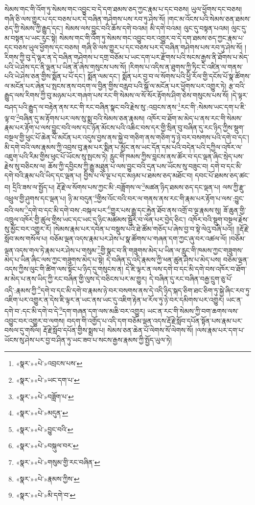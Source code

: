སེམས་གང་གི་འོག་ཏུ་སེམས་གང་འབྱུང་བ་དེ་དག་ཐམས་ཅད་ཀྱང་རྣམ་པ་དང་བཅས། ཡུལ་ཕྱོགས་དང་བཅས། གཞི་ཅི་ལས་གྱུར་པ་དང་བཅས་པར་དེ་བཞིན་གཤེགས་པས་རབ་ཏུ་ཤེས་སོ། །གང་མ་འོངས་པའི་སེམས་ཅན་ཐམས་ཅད་ཀྱི་སེམས་ཀྱི་རྒྱུད་དང་། སེམས་ལས་བྱུང་བའི་ཆོས་དགེ་བའམ། མི་དགེ་བའམ། ལུང་དུ་བསྟན་པའམ། ལུང་དུ་མ་བསྟན་པ་ཡང་རུང་སྟེ། སེམས་གང་གི་འོག་ཏུ་སེམས་གང་འབྱུང་བར་འགྱུར་བ་དེ་དག་ཐམས་ཅད་ཀྱང་རྣམ་པ་དང་བཅས་ཡུལ་ཕྱོགས་དང་བཅས། གཞི་ཅི་ལས་གྱུར་པ་དང་བཅས་པར་དེ་བཞིན་གཤེགས་པས་རབ་ཏུ་ཤེས་སོ། །རིགས་ཀྱི་བུ་དེ་ལྟར་ན་དེ་བཞིན་གཤེགས་པ་དགྲ་བཅོམ་པ་ཡང་དག་པར་རྫོགས་པའི་སངས་རྒྱས་ནི་ཐོགས་པ་མེད་པའི་ཡེ་ཤེས་དང་ནི་ལྡན་པ་ཡིན་ནོ་ཞེས་གསུངས་པས་སོ། །རིགས་པ་འདིས་ན་ཐུགས་ཀྱི་ཏིང་ངེ་འཛིན་ལ་གནས་པའི་ཡེ་ཤེས་ཅན་གྱིས་སྨོན་པ་པོ་དང་། སྨོན་ལམ་དང་། སྨོན་པར་བྱ་བ་ལ་སོགས་པའི་ཕྱི་རོལ་གྱི་དངོས་པོ་སྣ་ཚོགས་ལ་མངོན་པར་ཞེན་པ་སྤངས་ནས་བདག་ལ་བྱིན་གྱིས་བརླབ་པའི་སྒོ་ལ་མངོན་པར་ཕྱོགས་པར་འགྱུར་ཏེ། རྩ་བའི་རྒྱུད་ལས་རིགས་ཀྱི་བུ་མཉམ་པར་གཞག་པས་རང་གི་སེམས་ལ་སོ་སོར་རྟོགས་ཤིག་ཅེས་གསུངས་པས་སོ། །དེ་ལྟར་བཤད་པའི་རྒྱུད་ལ་བརྟེན་ནས་རང་གི་རང་བཞིན་སྣང་བའི་རྗེས་སུ་:འབྲངས་ནས་\footnote{«སྣར་»«པེ་»འབྲངས་པས་}རང་གི་:སེམས་ཡང་དག་པ་ཇི་ལྟ་བ་\footnote{«སྣར་»«པེ་»ཡང་དག་པ་}བཞིན་དུ་མ་རྟོགས་པར་ལས་སུ་སྨྲ་བའི་སེམས་ཅན་རྣམས། འཁོར་བ་ཐོག་མ་མེད་པ་ནས་རང་གི་སེམས་རྣམ་པར་རྟོག་པ་ལས་བྱུང་བའི་ལས་དང་ཉོན་མོངས་པའི་འཆིང་བས་དར་གྱི་སྲིན་བུ་བཞིན་དུ་རང་ཉིད་ཀྱིས་སྡུག་བསྔལ་གྱི་ཕུང་པོ་ཆེན་པོ་མངོན་པར་འདུས་བྱས་ནས་སྐྱེ་བ་གཅིག་ནས་གཅིག་ཏུ་ཉེ་བར་བསགས་པའི་དགེ་བ་དང་། མི་དགེ་བའི་ལས་རྣམས་ཀྱི་འབྲས་བུ་རྣམ་པར་སྨིན་པ་མྱོང་ནས་ཡང་དོན་དམ་པའི་བདེན་པའི་དཀྱིལ་འཁོར་ལ་འཇུག་པའི་རིམ་གྱིས་ཕུང་པོ་ཡོངས་སུ་སྤངས་ཏེ། རླུང་གི་ཁམས་ཀྱིས་བླངས་ནས་ཚོར་བ་དང་ལྡན་ཞིང་སྲེད་པས་རྗེས་སུ་བཅིངས་ལ། ཆོས་ཀྱི་དབྱིངས་ཀྱི་རྒྱུ་མཐུན་པ་ལས་བྱུང་བའི་དྲན་པས་ཡོངས་སུ་བཟུང་བ། དགེ་བ་དང་མི་དགེ་བའི་རྣམ་པའི་ཡིད་དང་ལྡན་པ། བྱིས་པ་ལོ་ལྔ་པ་དང་མཉམ་པ་ཐམས་ཅད་མཐོང་བ། དབང་པོ་ཐམས་ཅད་ཚང་བ། དྲིའི་ཟས་ལ་སྤྱོད་པ། རྡོ་རྗེ་ལ་སོགས་པས་ཀྱང་མི་:བཟློགས་ལ་\footnote{«སྣར་»«པེ་»བཟློག་པ་}མཚན་ཉིད་ཐམས་ཅད་དང་ལྡན་པ། ལས་ཀྱི་རྫུ་འཕྲུལ་གྱི་ཤུགས་དང་ལྡན་པ། ཉི་མ་བདུན་\footnote{«སྣར་»«པེ་»མདུན་}གྱིས་འོང་བའི་བར་ལ་གནས་ནས་རང་གི་རྣམ་པར་རྟོག་པ་ལས་:བྱུང་བའི་ལས་\footnote{«སྣར་»«པེ་»བྱུང་བའི་}དགེ་བ་དང་མི་དགེ་བས་:བསྐལ་པར་\footnote{«སྣར་»«པེ་»བསྐུལ་བར་}གྱུར་པས་རྒྱུ་དང་རྐྱེན་ཐོབ་ནས་འགྲོ་བ་ལྔ་རྣམས་སུ། ཟོ་ཆུན་གྱི་འཁྲུལ་འཁོར་གྱི་ཚུལ་གྱིས་ཡང་དང་ཡང་དུ་ཉིང་མཚམས་སྦྱོར་བ་ལེན་པར་བྱེད་ཅིང་། འཁོར་བའི་སྡུག་བསྔལ་རྗེས་སུ་མྱོང་བར་འགྱུར་རོ། །སེམས་རྣམ་པར་དབེན་པ་བསྡུས་པའི་ཐེ་ཚོམ་གཅོད་པ་ཞེས་བྱ་བ་སྟེ་ལེའུ་བཞི་པའོ།། །།རྡོ་རྗེ་སློབ་མས་གསོལ་པ། བཅོམ་ལྡན་འདས་རྣམ་པར་ཤེས་པ་སྣ་ཚོགས་པ་གཞན་དག་ཀྱང་ཞུ་བར་འཚལ་ལོ། །བཅོམ་ལྡན་འདས་གལ་ཏེ་རྣམ་པར་ཤེས་པ་གསུམ་\footnote{«སྣར་»«པེ་»གསུམ་གྱི་རང་བཞིན་}གྱི་སྣང་བ་ནི་གཟུགས་མེད་པ་ཡིན་ལ་རླུང་གི་ཁམས་ཀྱང་གཟུགས་མེད་པ་ཡིན་ཞིང་ལས་ཀྱང་གཟུགས་མེད་པ་སྟེ། དེ་བཞིན་དུ་འདི་རྣམས་ཀྱི་ཕན་ཚུན་ཤེས་པ་མེད་པས། བཅོམ་ལྡན་འདས་ཀྱིས་ལུང་གི་ཚིག་ལས་སྟོང་པ་ཉིད་དུ་གསུངས་ན། དེ་ཇི་ལྟར་ན་ལས་དགེ་བ་དང་མི་དགེ་བས་འཁོར་བ་ཐོག་མ་མེད་པ་ནས་ཡིད་ཀྱི་རང་བཞིན་གྱི་ལུས་དེ་བཅིངས་པར་མ་གྱུར། དེ་བཞིན་དུ་རང་བཞིན་བརྒྱ་དྲུག་ཅུ་པོ་འདི་:རྣམས་ཀྱི་\footnote{«སྣར་»«པེ་»རྣམས་ཀྱིས་}དགེ་བ་དང་མི་དགེ་བ་རྣམས་ཉེ་བར་བསགས་ནས་དེ་འདི་ཉིད་སྐད་ཅིག་ཐང་ཅིག་ཏུ་སྐྱེ་ཞིང་རབ་ཏུ་འཇིག་པར་འགྱུར་ན་དེས་ཇི་ལྟར་ན་ཡང་ནས་ཡང་དུ་འཇིག་རྟེན་ཕ་རོལ་ཏུ་ཉེ་བར་དམིགས་པར་འགྱུར། ཡང་ན་དགེ་བ་:དང་མི་དགེ་བ་དེ་\footnote{«སྣར་»«པེ་»མི་དགེ་བ་}དག་གཞན་དག་ལས་མཆི་བར་འགྱུར། ཡང་ན་རང་གི་སེམས་ཀྱི་བག་ཆགས་ལས་འབྱུང་བར་འགྱུར་བ་ལགས། བདག་གི་འགྱོད་པ་འདི་དག་བཅོམ་ལྡན་འདས་རྡོ་རྗེ་སློབ་དཔོན་སྟོན་པས་རྣམ་པར་བསལ་དུ་གསོལ། རྡོ་རྗེ་སློབ་དཔོན་གྱིས་སྨྲས་པ། སེམས་ཅན་ཆེན་པོ་ལེགས་སོ་ལེགས་སོ། །ལས་རྣམ་པར་དག་པ་ཡོངས་སུ་ཤེས་པར་བྱ་བ་ཤིན་ཏུ་ཡང་ཟབ་པ་སངས་རྒྱས་རྣམས་ཀྱི་སྤྱོད་ཡུལ་ཏེ། 